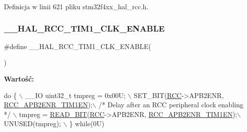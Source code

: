 Definicja w linii 621 pliku stm32f4xx\+\_\+hal\+\_\+rcc.\+h.

\mbox{\label{group___r_c_c___a_p_b2___clock___enable___disable_gad693d7300ed7134b60bb1a645e762358}} 
\subsubsection{\texorpdfstring{\+\_\+\+\_\+\+H\+A\+L\+\_\+\+R\+C\+C\+\_\+\+T\+I\+M1\+\_\+\+C\+L\+K\+\_\+\+E\+N\+A\+B\+LE}{\_\_HAL\_RCC\_TIM1\_CLK\_ENABLE}}
{\footnotesize\ttfamily \#define \+\_\+\+\_\+\+H\+A\+L\+\_\+\+R\+C\+C\+\_\+\+T\+I\+M1\+\_\+\+C\+L\+K\+\_\+\+E\+N\+A\+B\+LE(\begin{DoxyParamCaption}{ }\end{DoxyParamCaption})}

{\bfseries Wartość\+:}
\begin{DoxyCode}
\textcolor{keywordflow}{do} \{ \(\backslash\)
                                        \_\_IO uint32\_t tmpreg = 0x00U; \(\backslash\)
                                        SET\_BIT(\hyperlink{group___peripheral__declaration_ga74944438a086975793d26ae48d5882d4}{RCC}->APB2ENR, 
      \hyperlink{group___peripheral___registers___bits___definition_ga25852ad4ebc09edc724814de967816bc}{RCC\_APB2ENR\_TIM1EN});\(\backslash\)
                                        \textcolor{comment}{/* Delay after an RCC peripheral clock enabling */} \(\backslash\)
                                        tmpreg = \hyperlink{group___exported__macro_ga822bb1bb9710d5f2fa6396b84e583c33}{READ\_BIT}(\hyperlink{group___peripheral__declaration_ga74944438a086975793d26ae48d5882d4}{RCC}->APB2ENR, 
      \hyperlink{group___peripheral___registers___bits___definition_ga25852ad4ebc09edc724814de967816bc}{RCC\_APB2ENR\_TIM1EN});\(\backslash\)
                                        UNUSED(tmpreg); \(\backslash\)
                                          \} \textcolor{keywordflow}{while}(0U)
\end{DoxyCode}


